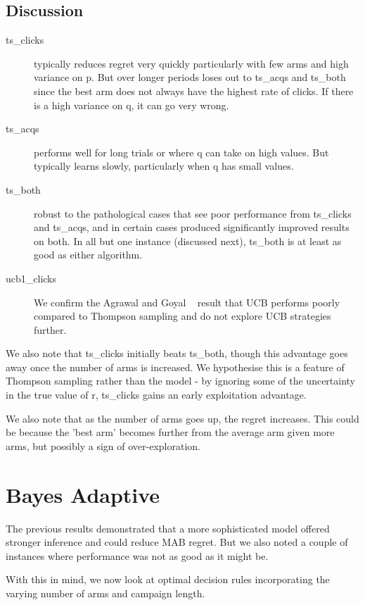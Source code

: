 \documentclass[11pt,a4,singlespacing,titlepagenumber=on]{scrreprt}
\numberwithin{equation}{chapter} %
\theoremstyle{remark}
\begin{document}
\subsection{Discussion}

\begin{description}
	\item[ts\_clicks] typically reduces regret very quickly particularly with few arms and high variance on p. But over longer periods loses out to ts\_acqs and ts\_both since the best arm does not always have the highest rate of clicks. If there is a high variance on q, it can go very wrong.
	\item[ts\_acqs] performs well for long trials or where q can take on high values. But typically learns slowly, particularly when q has small values.
	\item[ts\_both] robust to the pathological cases that see poor performance from ts\_clicks and ts\_acqs, and in certain cases produced significantly improved results on both. In all but one instance (discussed next), ts\_both is at least as good as either algorithm.
	\item[ucb1\_clicks] We confirm the Agrawal and Goyal ~\cite{DBLP:journals/corr/abs-1111-1797} result that UCB performs poorly compared to Thompson sampling and do not explore UCB strategies further.
\end{description}

We also note that ts\_clicks initially beats ts\_both, though this advantage goes away once the number of arms is increased. We hypothesise this is a feature of Thompson sampling rather than the model - by ignoring some of the uncertainty in the true value of r, ts\_clicks gains an early exploitation advantage.

We also note that as the number of arms goes up, the regret increases. This could be because the 'best arm' becomes further from the average arm given more arms, but possibly a sign of over-exploration.


\section{ Bayes Adaptive }

The previous results demonstrated that a more sophisticated model offered stronger inference and could reduce MAB regret. But we also noted a couple of instances where performance was not as good as it might be. 

With this in mind, we now look at optimal decision rules incorporating the varying number of arms and campaign length.
\end{document}
